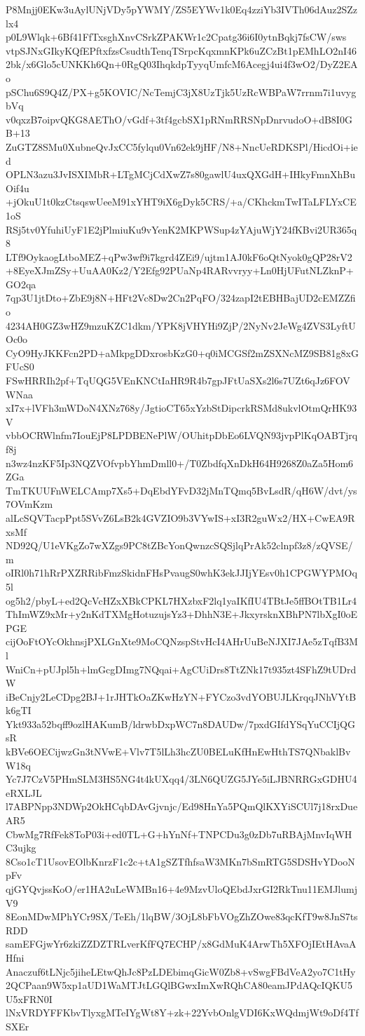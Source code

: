 P8Mnjj0EKw3uAylUNjVDy5pYWMY/ZS5EYWv1k0Eq4zziYb3IVTh06dAuz2SZzlx4
p0L9Wlqk+6Bf41FfTxsghXnvCSrkZPAKWr1c2Cpatg36i6I0ytnBqkj7fsCW/sws
vtpSJNxGIkyKQfEPftxfzsCsudthTenqTSrpcKqxmnKPk6uZCzBt1pEMhLO2nI46
2bk/x6Glo5cUNKKh6Qn+0RgQ03IhqkdpTyyqUmfcM6Acegj4ui4f3wO2/DyZ2EAo
pSChu6S9Q4Z/PX+g5KOVIC/NcTemjC3jX8UzTjk5UzRcWBPaW7rrnm7i1uvygbVq
v0qxzB7oipvQKG8AEThO/vGdf+3tf4gcbSX1pRNmRRSNpDnrvudoO+dB8I0GB+13
ZuGTZ8SMu0XubneQvJxCC5fylqu0Vn62ek9jHF/N8+NncUeRDKSPl/HicdOi+ied
OPLN3azu3JvISXIMbR+LTgMCjCdXwZ7s80gawlU4uxQXGdH+IHkyFmnXhBuOif4u
+jOkuU1t0kzCtsqswUeeM91xYHT9iX6gDyk5CRS/+a/CKhckmTwITaLFLYxCE1oS
RSj5tv0YfuhiUyF1E2jPlmiuKu9vYenK2MKPWSup4zYAjuWjY24fKBvi2UR365q8
LTf9OykaogLtboMEZ+qPw3wf9i7kgrd4ZEi9/ujtm1AJ0kF6oQtNyok0gQP28rV2
+8EyeXJmZSy+UuAA0Kz2/Y2Efg92PUaNp4RARvvryy+Ln0HjUFutNLZknP+GO2qa
7qp3U1jtDto+ZbE9j8N+HFt2Vc8Dw2Cn2PqFO/324zapI2tEBHBajUD2cEMZZfio
4234AH0GZ3wHZ9mzuKZC1dkm/YPK8jVHYHi9ZjP/2NyNv2JeWg4ZVS3LyftUOc0o
CyO9HyJKKFcn2PD+aMkpgDDxrosbKzG0+q0iMCGSf2mZSXNcMZ9SB81g8xGFUcS0
FSwHRRIh2pf+TqUQG5VEnKNCtIaHR9R4b7gpJFtUaSXs2l6s7UZt6qJz6FOVWNaa
xI7x+lVFh3mWDoN4XNz768y/JgtioCT65xYzbStDipcrkRSMd8ukvlOtmQrHK93V
vbbOCRWlnfm7IouEjP8LPDBENePlW/OUhitpDbEo6LVQN93jvpPlKqOABTjrqf8j
n3wz4nzKF5Ip3NQZVOfvpbYhmDmll0+/T0ZbdfqXnDkH64H9268Z0aZa5Hom6ZGa
TmTKUUFnWELCAmp7Xs5+DqEbdYFvD32jMnTQmq5BvLsdR/qH6W/dvt/ys7OVmKzm
alLcSQVTacpPpt5SVvZ6LsB2k4GVZIO9b3VYwIS+xI3R2guWx2/HX+CwEA9RxsMf
ND92Q/U1eVKgZo7wXZgs9PC8tZBcYonQwnzcSQSjlqPrAk52clnpf3z8/zQVSE/m
oIRl0h71hRrPXZRRibFmzSkidnFHsPvaugS0whK3ekJJIjYEsv0h1CPGWYPMOq5l
og5h2/pbyL+ed2QcVcHZxXBkCPKL7HXzbxF2lq1yaIKfIU4TBtJe5ffBOtTB1Lr4
ThImWZ9xMr+y2nKdTXMgHotuzujsYz3+DhhN3E+JkxyrsknXBhPN7lbXgI0oEPGE
cijOoFtOYcOkhnsjPXLGnXte9MoCQNzspStvHcI4AHrUuBeNJXI7JAe5zTqfB3Ml
WniCn+pUJpl5h+lmGcgDImg7NQqai+AgCUiDrs8TtZNk17t935zt4SFhZ9tUDrdW
iBeCnjy2LeCDpg2BJ+1rJHTkOaZKwHzYN+FYCzo3vdYOBUJLKrqqJNhVYtBk6gTI
Ykt933a52bqff9ozlHAKumB/ldrwbDxpWC7n8DAUDw/7pxdGIfdYSqYuCCIjQGsR
kBVe6OECijwzGn3tNVwE+Vlv7T5lLh3hcZU0BELuKfHnEwHthTS7QNbaklBvW18q
Yc7J7CzV5PHmSLM3HS5NG4t4kUXqq4/3LN6QUZG5JYe5iLJBNRRGxGDHU4eRXLJL
l7ABPNpp3NDWp2OkHCqbDAvGjvnjc/Ed98HnYa5PQmQlKXYiSCUl7j18rxDueAR5
CbwMg7RfFek8ToP03i+ed0TL+G+hYnNf+TNPCDu3g0zDb7uRBAjMnvIqWHC3ujkg
8Cso1cT1UsovEOlbKnrzF1c2c+tA1gSZTfhfsaW3MKn7bSmRTG5SDSHvYDooNpFv
qjGYQvjssKoO/er1HA2uLeWMBn16+4e9MzvUloQEbdJxrGI2RkTnu11EMJlumjV9
8EonMDwMPhYCr9SX/TeEh/1lqBW/3OjL8bFbVOgZhZOwe83qcKfT9w8JnS7tsRDD
samEFGjwYr6zkiZZDZTRLverKfFQ7ECHP/x8GdMuK4ArwTh5XFOjIEtHAvaAHfni
Anaczuf6tLNjc5jiheLEtwQhJc8PzLDEbimqGicW0Zb8+vSwgFBdVeA2yo7C1tHy
2QCPaan9W5xp1aUD1WaMTJtLGQlBGwxImXwRQhCA80eamJPdAQcIQKU5U5xFRN0I
lNxVRDYFFKbvTlyxgMTeIYgWt8Y+zk+22YvbOnlgVDI6KxWQdmjWt9oDf4TfSXEr
